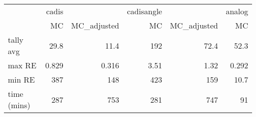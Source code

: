 \begin{tabular}{lrrrrr}
\toprule
{} & cadis &             & cadisangle &             & analog \\
{} &    MC & MC\_adjusted &         MC & MC\_adjusted &     MC \\
\midrule
tally avg   &  29.8 &        11.4 &        192 &        72.4 &   52.3 \\
max RE      & 0.829 &       0.316 &       3.51 &        1.32 &  0.292 \\
min RE      &   387 &         148 &        423 &         159 &   10.7 \\
time (mins) &   287 &         753 &        281 &         747 &     91 \\
\bottomrule
\end{tabular}
